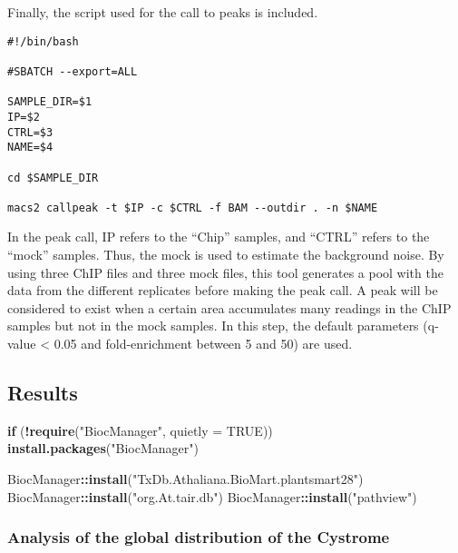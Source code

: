 \documentclass[
]{article}
\newenvironment{Shaded}{\begin{snugshade}}{\end{snugshade}}
\newcommand{\AttributeTok}[1]{\textcolor[rgb]{0.13,0.29,0.53}{#1}}
\newcommand{\ConstantTok}[1]{\textcolor[rgb]{0.56,0.35,0.01}{#1}}
\newcommand{\ControlFlowTok}[1]{\textcolor[rgb]{0.13,0.29,0.53}{\textbf{#1}}}
\newcommand{\FunctionTok}[1]{\textcolor[rgb]{0.13,0.29,0.53}{\textbf{#1}}}
\newcommand{\NormalTok}[1]{#1}
\newcommand{\SpecialCharTok}[1]{\textcolor[rgb]{0.81,0.36,0.00}{\textbf{#1}}}
\newcommand{\StringTok}[1]{\textcolor[rgb]{0.31,0.60,0.02}{#1}}
\begin{document}
Finally, the script used for the call to peaks is included.

\begin{verbatim}
#!/bin/bash

#SBATCH --export=ALL

SAMPLE_DIR=$1
IP=$2
CTRL=$3
NAME=$4

cd $SAMPLE_DIR

macs2 callpeak -t $IP -c $CTRL -f BAM --outdir . -n $NAME
\end{verbatim}

In the peak call, IP refers to the ``Chip'' samples, and ``CTRL'' refers
to the ``mock'' samples. Thus, the mock is used to estimate the
background noise. By using three ChIP files and three mock files, this
tool generates a pool with the data from the different replicates before
making the peak call. A peak will be considered to exist when a certain
area accumulates many readings in the ChIP samples but not in the mock
samples. In this step, the default parameters (q-value \textless{} 0.05
and fold-enrichment between 5 and 50) are used.

\hypertarget{results}{%
\subsection{Results}\label{results}}

\begin{Shaded}
\begin{Highlighting}[]
\ControlFlowTok{if}\NormalTok{ (}\SpecialCharTok{!}\FunctionTok{require}\NormalTok{(}\StringTok{"BiocManager"}\NormalTok{, }\AttributeTok{quietly =} \ConstantTok{TRUE}\NormalTok{))}
    \FunctionTok{install.packages}\NormalTok{(}\StringTok{"BiocManager"}\NormalTok{)}

\NormalTok{BiocManager}\SpecialCharTok{::}\FunctionTok{install}\NormalTok{(}\StringTok{"TxDb.Athaliana.BioMart.plantsmart28"}\NormalTok{)}
\NormalTok{BiocManager}\SpecialCharTok{::}\FunctionTok{install}\NormalTok{(}\StringTok{"org.At.tair.db"}\NormalTok{)}
\NormalTok{BiocManager}\SpecialCharTok{::}\FunctionTok{install}\NormalTok{(}\StringTok{"pathview"}\NormalTok{)}
\end{Highlighting}
\end{Shaded}

\hypertarget{analysis-of-the-global-distribution-of-the-cystrome}{%
\subsubsection{Analysis of the global distribution of the
Cystrome}\label{analysis-of-the-global-distribution-of-the-cystrome}}
\end{document}
